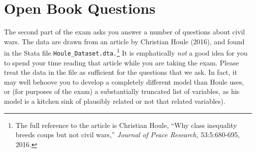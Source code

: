 \documentclass[12pt]{article}
\begin{document}
\newpage
\section{Open Book Questions}

The second part of the exam asks you answer a number of questions about civil wars. The data are drawn from an article by Christian Houle (2016), and found in the Stata file {\tt Houle\_Dataset.dta.}\footnote{The full reference to the article is Christian Houle, ``Why class inequality breeds coups but not civil wars,'' {\em Journal of Peace Research,} 53:5:680-695, 2016.} It is emphatically {\em not} a good idea for you to spend your time reading that article while you are taking the exam. Please treat the data in the file as sufficient for the questions that we ask. In fact, it may well behoove you to develop a completely different model than Houle uses, or (for purposes of the exam) a substantially truncated list of variables, as his model is a kitchen sink of plausibly related or not that related variables).
\end{document}
